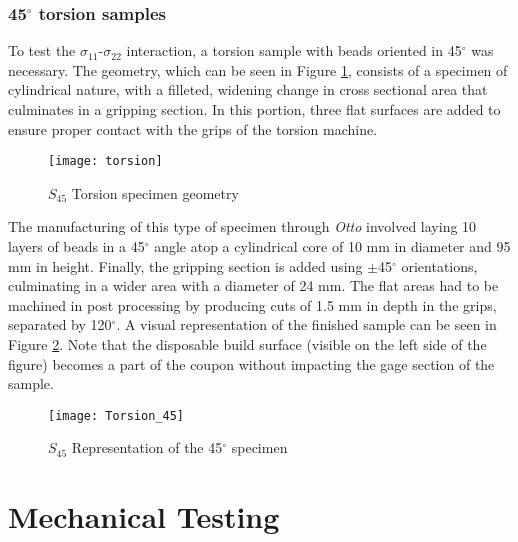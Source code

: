 \documentclass[main.tex]{subfiles}
\begin{document}
\subsubsection{45$^\circ$ torsion samples}

To test the $\sigma_{11}$-$\sigma_{22}$ interaction, a torsion sample with beads oriented in 45$^\circ$ was necessary. The geometry, which can be seen in Figure \ref{fig:tors45}, consists of a specimen of cylindrical nature, with a filleted, widening change in cross sectional area that culminates in a gripping section. In this portion, three flat surfaces are added to ensure proper contact with the grips of the torsion machine. 
\begin{figure}[h]
	\center
	\texttt{[image: torsion]}
	\caption{$S_{45}$ Torsion specimen geometry} \label{fig:tors45}
\end{figure}

The manufacturing of this type of specimen through \emph{Otto} involved laying 10 layers of beads in a 45$^\circ$ angle atop a cylindrical core of 10 mm in diameter and 95 mm in height. Finally, the gripping section is added using $\pm$45$^\circ$ orientations, culminating in a wider area with a diameter of 24 mm. The flat areas had to be machined in post processing by producing cuts of 1.5 mm in depth in the grips, separated by 120$^\circ$. A visual representation of the finished sample can be seen in Figure \ref{fig:tors45d}. Note that the disposable build surface (visible on the left side of the figure) becomes a part of the coupon without impacting the gage section of the sample.
\begin{figure}[h]
	\center
	\texttt{[image: Torsion\_45]}
	\caption{$S_{45}$ Representation of the 45$^\circ$ specimen} \label{fig:tors45d}
\end{figure}
\section{Mechanical Testing}
% 

\end{document}
